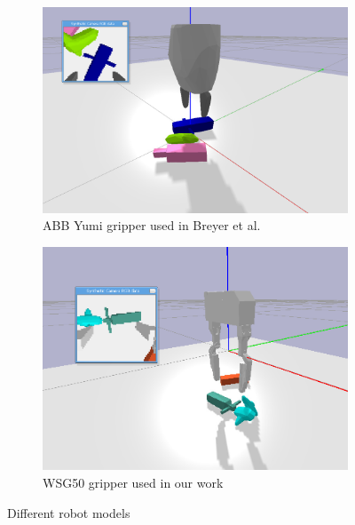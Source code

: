 \begin{figure}

    \begin{subfigure}{0.49\textwidth}
      \includegraphics[width=\linewidth]{figures/breyerModel.png}
      \caption{ABB Yumi gripper used in Breyer et al.} \label{fig:breyer}
    \end{subfigure}%
    \hspace*{\fill}   %
    \begin{subfigure}{0.49\textwidth}
      \includegraphics[width=\linewidth]{figures/ourModel.png}
      \caption{WSG50 gripper used in our work} \label{fig:ourmodel}
    \end{subfigure}%
    \hspace*{\fill}   %


\caption{ Different robot models \label{fig:robots}}
\end{figure}